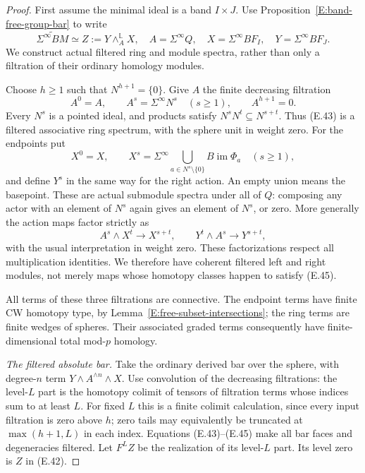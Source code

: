 \begin{proof}
First assume the minimal ideal is a band $I\times J$.  Use
Proposition~\ref{E:band-free-group-bar} to write
\[
 \widetilde{\Sigma^\infty BM}\simeq
 Z:=Y\wedge_A^{\mathbb L}X,
 \quad A=\Sigma^\infty Q,
 \quad X=\Sigma^\infty BF_I,
 \quad Y=\Sigma^\infty BF_J.                          \tag{E.42}
\]
We construct actual filtered ring and module spectra, rather than
only a filtration of their ordinary homology modules.

Choose $h\geq1$ such that $N^{h+1}=\{0\}$.  Give $A$ the finite
decreasing filtration
\[
 A^0=A,\qquad A^s=\Sigma^\infty N^s\quad(s\geq1),
 \qquad A^{h+1}=0.                                   \tag{E.43}
\]
Every $N^s$ is a pointed ideal, and products satisfy
$N^sN^t\subseteq N^{s+t}$.  Thus (E.43) is a filtered associative
ring spectrum, with the sphere unit in weight zero.
For the endpoints put
\[
 X^0=X,\qquad
 X^s=\Sigma^\infty
       \bigcup_{a\in N^s\setminus\{0\}}
              B\operatorname{im}\Phi_a\quad(s\geq1),  \tag{E.44}
\]
and define $Y^s$ in the same way for the right action.  An empty
union means the basepoint.  These are actual submodule spectra
under all of $Q$: composing any actor with an element of $N^s$
again gives an element of $N^s$, or zero.  More generally the
action maps factor strictly as
\[
 A^s\wedge X^t\longrightarrow X^{s+t},\qquad
 Y^t\wedge A^s\longrightarrow Y^{s+t},                 \tag{E.45}
\]
with the usual interpretation in weight zero.  These factorizations
respect all multiplication identities.  We therefore have coherent
filtered left and right modules, not merely maps whose homotopy
classes happen to satisfy (E.45).

All terms of these three filtrations are connective.  The endpoint
terms have finite CW homotopy type, by
Lemma~\ref{E:free-subset-intersections}; the ring terms are finite
wedges of spheres.  Their associated graded terms consequently
have finite-dimensional total mod-$p$ homology.

\emph{The filtered absolute bar.}
Take the ordinary derived bar over the sphere, with degree-$n$
term $Y\wedge A^{\wedge n}\wedge X$.  Use convolution of the
decreasing filtrations: the level-$L$ part is the homotopy colimit
of tensors of filtration terms whose indices sum to at least $L$.
For fixed $L$ this is a finite colimit calculation, since every
input filtration is zero above $h$; zero tails may equivalently
be truncated at $\max(h+1,L)$ in each index.
Equations (E.43)--(E.45) make all bar faces and degeneracies
filtered.  Let $F^LZ$ be the realization of its level-$L$ part.
Its level zero is $Z$ in (E.42).


\end{proof}
